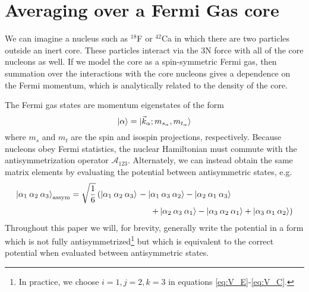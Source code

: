 \section{\label{sec:averaging}Averaging over a Fermi Gas core}

We can imagine a nucleus such as $^{18}$F or $^{42}$Ca in which there are two particles outside an inert core. These particles interact via the 3N force with all of the core nucleons as well. If we model the core as a spin-symmetric Fermi gas, then summation over the interactions with the core nucleons gives a dependence on the Fermi momentum, which is analytically related to the density of the core. 

The Fermi gas states are momentum eigenstates of the form
\begin{equation}
\ket{\alpha}=\ket{\vec{k}_\alpha;m_{s_\alpha},m_{t_\alpha}}
\end{equation}
where $m_s$ and $m_t$ are the spin and isospin projections, respectively. %
Because nucleons obey Fermi statistics, the nuclear Hamiltonian must commute with the antisymmetrization operator $\mathcal{A}_{123}$. Alternately, we can instead obtain the same matrix elements by evaluating the potential between antisymmetric states, e.g.
\begin{equation}
\begin{split}
\ket{\alpha_1\:\alpha_2\:\alpha_3}_{\text{assym}} = \sqrt{\frac{1}{6}} \left( \ket{\alpha_1\:\alpha_2\:\alpha_3}\right. & - \ket{\alpha_1\:\alpha_3\:\alpha_2} - \ket{\alpha_2\:\alpha_1\:\alpha_3}   \\
&\hspace{.5cm}\left. +\ket{\alpha_2\:\alpha_3\:\alpha_1} - \ket{\alpha_3\:\alpha_2\:\alpha_1} + \ket{\alpha_3\:\alpha_1\:\alpha_2} \right)
\end{split}
\end{equation}
Throughout this paper we will, for brevity, generally write the potential in a form which is not fully antisymmetrized\footnote{In practice, we choose $i=1,j=2,k=3$ in equations \eqref{eq:V_E}-\eqref{eq:V_C}.} but which is equivalent to the correct potential when evaluated between antisymmetric states.

